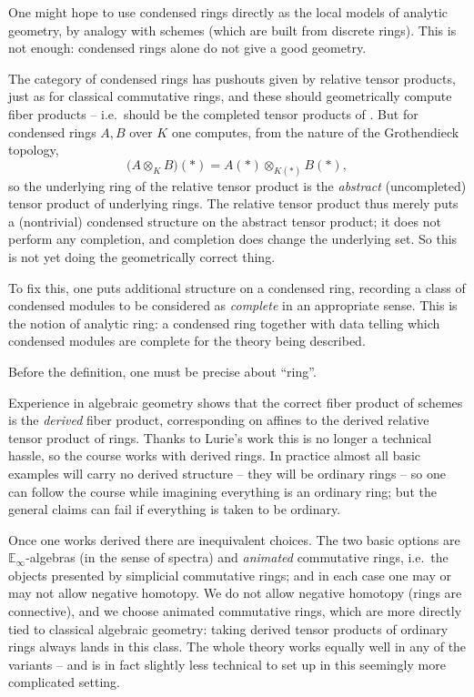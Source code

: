 One might hope to use condensed rings directly as the local models of analytic
geometry, by analogy with schemes (which are built from discrete rings). This is
not enough: condensed rings alone do not give a good geometry.

\begin{remark}
\label{rmk:1:condensed-rings-insufficient}
The category of condensed rings has pushouts given by relative tensor products,
just as for classical commutative rings, and these should geometrically compute
fiber products -- i.e.\ should be the completed tensor products of
. But for condensed rings $A,B$ over $K$ one computes,
from the nature of the Grothendieck topology,
\begin{equation*}
\bigl(A\otimes_{K} B\bigr)(\ast)=A(\ast)\otimes_{K(\ast)} B(\ast),
\end{equation*}
so the underlying ring of the relative tensor product is the \emph{abstract}
(uncompleted) tensor product of underlying rings. The relative tensor product
thus merely puts a (nontrivial) condensed structure on the abstract tensor
product; it does not perform any completion, and completion does change the
underlying set. So this is not yet doing the geometrically correct thing.
\end{remark}

To fix this, one puts additional structure on a condensed ring, recording a class
of condensed modules to be considered as \emph{complete} in an appropriate sense.
This is the notion of analytic ring: a condensed ring together with data telling
which condensed modules are complete for the theory being described.

Before the definition, one must be precise about ``ring''.

\begin{remark}
\label{rmk:1:which-ring}
Experience in algebraic geometry shows that the correct fiber product of schemes
is the \emph{derived} fiber product, corresponding on affines to the derived
relative tensor product of rings. Thanks to Lurie's work \cite{lurie2017higher}
this is no longer a technical hassle, so the course works with derived rings. In
practice almost all basic examples will carry no derived structure -- they will
be ordinary rings -- so one can follow the course while imagining everything is
an ordinary ring; but the general claims can fail if everything is taken to be
ordinary.

Once one works derived there are inequivalent choices. The two basic options are
$\mathbb{E}_\infty$-algebras (in the sense of spectra) and \emph{animated}
commutative rings, i.e.\ the objects presented by simplicial commutative rings;
and in each case one may or may not allow negative homotopy. We do not allow
negative homotopy (rings are connective), and we choose animated commutative
rings, which are more directly tied to classical algebraic geometry: taking
derived tensor products of ordinary rings always lands in this class. The whole
theory works equally well in any of the variants -- and is in fact slightly less
technical to set up in this seemingly more complicated setting.
\end{remark}

